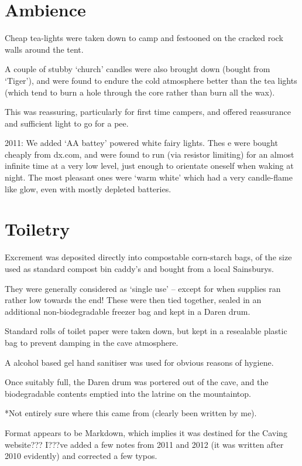 \section{Ambience}\label{ambience}

Cheap tea-lights were taken down to camp and festooned on the cracked
rock walls around the tent.

A couple of stubby `church' candles were also brought down (bought from
`Tiger'), and were found to endure the cold atmosphere better than the
tea lights (which tend to burn a hole through the core rather than burn
all the wax).

This was reassuring, particularly for first time campers, and offered
reassurance and sufficient light to go for a pee.

2011: We added `AA battey' powered white fairy lights. Thes e were
bought cheaply from dx.com, and were found to run (via resistor
limiting) for an almost infinite time at a very low level, just enough
to orientate oneself when waking at night. The most pleasant ones were
`warm white' which had a very candle-flame like glow, even with mostly
depleted batteries.

\section{Toiletry}\label{toiletry}

Excrement was deposited directly into compostable corn-starch bags, of
the size used as standard compost bin caddy's and bought from a local
Sainsburys.

They were generally considered as `single use' -- except for when
supplies ran rather low towards the end! These were then tied together,
sealed in an additional non-biodegradable freezer bag and kept in a
Daren drum.

Standard rolls of toilet paper were taken down, but kept in a resealable
plastic bag to prevent damping in the cave atmosphere.

A alcohol based gel hand sanitiser was used for obvious reasons of
hygiene.

Once suitably full, the Daren drum was portered out of the cave, and the
biodegradable contents emptied into the latrine on the mountaintop.

*Not entirely sure where this came from (clearly been written by me).

Format appears to be Markdown, which implies it was destined for the
Caving website??? I???ve added a few notes from 2011 and 2012 (it was
written after 2010 evidently) and corrected a few typos.


